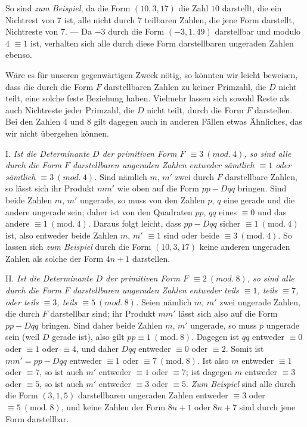 So sind \textit{zum Beispiel}, da die Form $(10,3,17)$ die Zahl $10$ darstellt, die ein Nichtrest von $7$ ist, alle nicht durch $7$ teilbaren Zahlen, die jene Form darstellt, Nichtreste von $7$. --- Da $-3$ durch die Form $(-3,1,49)$ darstellbar und modulo $4$ $\equiv1$ ist, verhalten sich alle durch diese Form darstellbaren ungeraden Zahlen ebenso.

Wäre es für unseren gegenwärtigen Zweck nötig, so könnten wir leicht beweisen, dass die durch die Form $F$ darstellbaren Zahlen zu keiner Primzahl, die $D$ nicht teilt, eine solche feste Beziehung haben. Vielmehr lassen sich sowohl Reste als auch Nichtreste jeder Primzahl, die $D$ nicht teilt, durch die Form $F$ darstellen. Bei den Zahlen $4$ und $8$ gilt dagegen auch in anderen Fällen etwas Ähnliches, das wir nicht übergehen können.

I. \textit{Ist die Determinante $D$ der primitiven Form $F$ $\equiv3\ (\mathit{mod.}\ 4)$, so sind alle durch die Form $F$ darstellbaren ungeraden Zahlen entweder sämtlich $\equiv1$ oder sämtlich $\equiv3\ (\mathit{mod.}\ 4)$.} Sind nämlich $m$, $m'$ zwei durch $F$ darstellbare Zahlen, so lässt sich ihr Produkt $mm'$ wie oben auf die Form $pp-Dqq$ bringen. Sind beide Zahlen $m$, $m'$ ungerade, so muss von den Zahlen $p$, $q$ eine gerade und die andere ungerade sein; daher ist von den Quadraten $pp$, $qq$ eines $\equiv0$ und das andere $\equiv1\ (\mathrm{mod.}\ 4)$. Daraus folgt leicht, dass $pp-Dqq$ sicher $\equiv1\ (\mathrm{mod.}\ 4)$ ist, also entweder beide Zahlen $m$, $m'$ $\equiv1$ sind oder beide $\equiv3\ (\mathrm{mod.}\ 4)$. So lassen sich \textit{zum Beispiel} durch die Form $(10,3,17)$ keine anderen ungeraden Zahlen als solche der Form $4n+1$ darstellen.

II. \textit{Ist die Determinante $D$ der primitiven Form $F$ $\equiv2\ (\mathit{mod.}\ 8)$, so sind alle durch die Form $F$ darstellbaren ungeraden Zahlen entweder teils $\equiv1$, teils $\equiv7$, oder teils $\equiv3$, teils $\equiv5\ (\mathit{mod.}\ 8)$.} Seien nämlich $m$, $m'$ zwei ungerade Zahlen,
die durch $F$ darstellbar sind; ihr Produkt $mm'$ lässt sich also auf die Form $pp-Dqq$ bringen. Sind daher beide Zahlen $m$, $m'$ ungerade, so muss $p$ ungerade sein (weil $D$ gerade ist), also gilt $pp\equiv1\ (\mathrm{mod.}\ 8)$. Dagegen ist $qq$ entweder $\equiv0$ oder $\equiv1$ oder $\equiv4$, und daher $Dqq$ entweder $\equiv0$ oder $\equiv2$. Somit ist $mm'=pp-Dqq$ entweder $\equiv1$ oder $\equiv7\ (\mathrm{mod.}\ 8)$. Ist also $m$ entweder $\equiv1$ oder $\equiv7$, so ist auch $m'$ entweder $\equiv1$ oder $\equiv7$; ist dagegen $m$ entweder $\equiv3$ oder $\equiv5$, so ist auch $m'$ entweder $\equiv3$ oder $\equiv5$. \textit{Zum Beispiel} sind alle durch die Form $(3,1,5)$ darstellbaren ungeraden Zahlen entweder $\equiv3$ oder $\equiv5\ (\mathrm{mod.}\ 8)$, und keine Zahlen der Form $8n+1$ oder $8n+7$ sind durch jene Form darstellbar.

